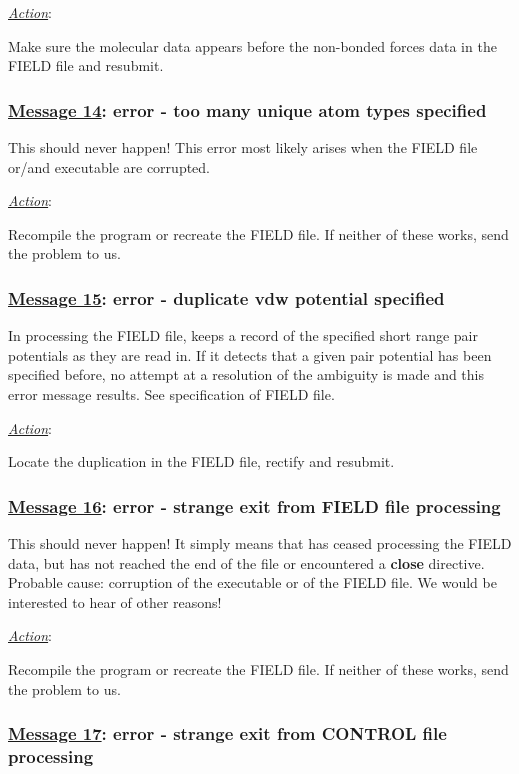 \noindent \underline{\em Action}:

Make sure the molecular data appears before the
non-bonded forces data in the FIELD
file and resubmit.

\subsubsection*{\underline{Message 14}: error - too many unique atom types specified}

This should never happen!  This error most likely arises when the
FIELD file or/and \D executable are corrupted.

\noindent \underline{\em Action}:

Recompile the program or recreate the FIELD file.  If neither of
these works, send the problem to us.


\subsubsection*{\underline{Message 15}: error - duplicate vdw potential specified}

In processing the FIELD file,  \D keeps a record of the specified
short range pair potentials as they are read in.  If it detects
that a given pair potential has been specified before, no attempt
at a resolution of the ambiguity is made and this error message
results.  See specification of FIELD file.

\noindent \underline{\em Action}:

Locate the duplication in the FIELD file, rectify and resubmit.

\subsubsection*{\underline{Message 16}: error - strange exit from FIELD file processing}

This should never happen!  It simply means that \D has ceased
processing the FIELD data, but has not reached the end of the file
or encountered a {\bf close} directive. Probable cause: corruption
of the \D executable or of the FIELD file.  We would be interested
to hear of other reasons!

\noindent \underline{\em Action}:

Recompile the program or recreate the FIELD file.  If neither of
these works, send the problem to us.

\subsubsection*{\underline{Message 17}: error - strange exit from CONTROL file processing}

